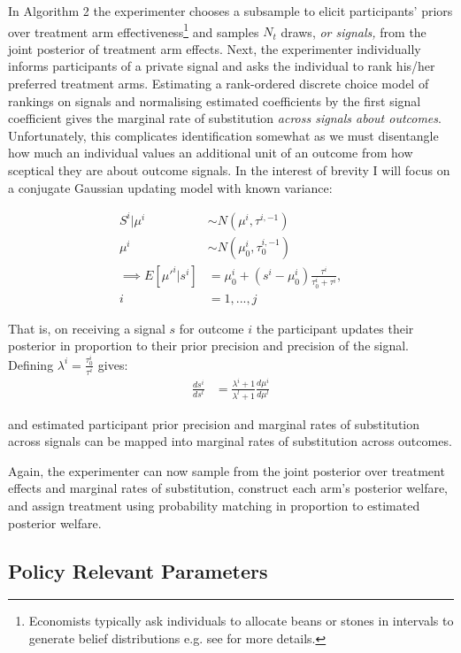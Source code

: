 \documentclass[twoside,11pt]{article}
\begin{document}
In Algorithm 2 the experimenter chooses a subsample to elicit participants'
 priors over treatment arm 
effectiveness\footnote{Economists typically ask individuals to allocate beans or 
stones in intervals to generate belief distributions e.g. see \cite{ar-delavande} for more details.}
and samples $N_t$ draws, \emph{or signals,} from the joint posterior of treatment arm effects. 
Next, the experimenter individually informs participants of a private signal
and asks the individual to rank his/her preferred treatment arms. Estimating a 
rank-ordered discrete choice model of rankings on signals and normalising 
estimated coefficients by the first signal coefficient gives the marginal  
rate of substitution \emph{across signals about outcomes}. Unfortunately, this 
complicates identification somewhat as we must disentangle how much an individual 
values an additional unit of an outcome from how sceptical they are about 
outcome signals. In the interest of brevity I will focus on a conjugate Gaussian 
updating model with known variance: 


\begin{align*}
    S^i  | \mu^i  &\sim N\left(\mu^i, \tau^{i,-1}\right) \\
    \mu^i &\sim N\left(\mu^i_0, \tau_0^{i,-1}\right) \\
    \implies E[\mu'^{i} | s^{i} ]   &= \mu^i_0 + (s^i - \mu^i_0) \frac{\tau^i}{\tau^i_0 + \tau^i}, 
    \\ i &= 1, ..., j 
\end{align*}
   
That is, on receiving a signal $s$ for outcome $i$ the participant updates their
 posterior in proportion to their prior precision and precision of the signal. 
 Defining $\lambda^i = \frac{\tau^i_0}{\tau^i}$ gives:
 \begin{align*}
   \frac{ds^i}{ds^l} &= \frac{\lambda^i + 1}{\lambda^l + 1} \frac{d\mu^i}{d\mu^l}
 \end{align*}

and estimated participant prior precision and marginal rates of substitution 
across signals can be mapped into marginal rates of substitution across outcomes.


Again, the experimenter can now sample from 
the joint posterior over treatment effects and marginal rates of substitution, 
construct each arm's posterior welfare, and assign treatment using probability 
matching in proportion to estimated posterior welfare.

\subsection{Policy Relevant Parameters}
\end{document}
